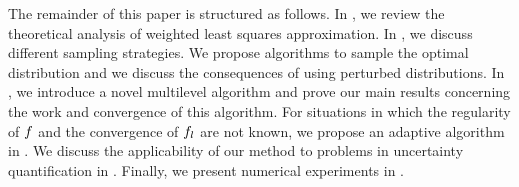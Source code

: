 The remainder of this paper is structured as follows. In , we review the theoretical analysis of weighted least squares approximation. In , we discuss different sampling strategies. We propose algorithms to sample the optimal distribution and we discuss the consequences of using perturbed distributions. In , we introduce a novel multilevel algorithm and prove our main results concerning the work and convergence of this algorithm. For situations in which the regularity of $f$ and the convergence of $f_l$ are not known, we propose an adaptive algorithm in . We discuss the applicability of our method to problems in uncertainty quantification in . Finally, we present numerical experiments in .
